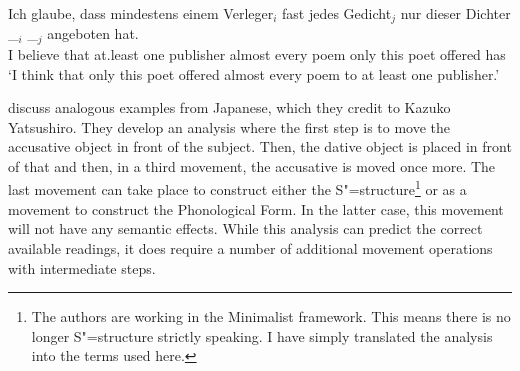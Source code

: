\ea
\gll Ich glaube, dass mindestens einem Verleger$_i$ fast jedes Gedicht$_j$ nur dieser Dichter \_$_i$ \_$_j$ angeboten hat.\\
	 I believe that at.least one publisher almost every poem only this poet {} {} offered has\\
\glt `I think that only this poet offered almost every poem to at least one publisher.'
\z

\citet[]{SE2002a} discuss analogous examples from Japanese, which they credit to Kazuko 
Yatsushiro. They develop an analysis where the first step is to move the accusative object in front of the subject.
Then, the dative object is placed in front of that and then, in a third movement, the accusative is moved once more. The last movement can
take place to construct either the S"=structure\footnote{%
	The authors are working in the Minimalist framework. This means there is no longer S"=structure strictly speaking. I
	have simply translated the analysis into the terms used here.
}
or as a movement to construct the Phonological Form. In the latter case, this movement will not have any semantic effects.
While this analysis can predict the correct available readings, it does require a number of additional movement operations with intermediate steps.

